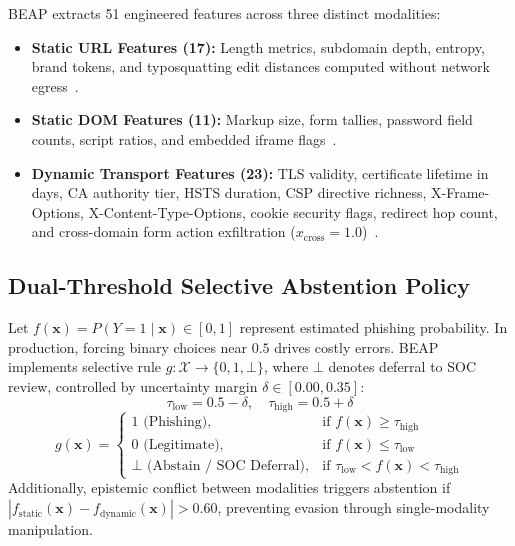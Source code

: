 \documentclass{llncs}
\begin{document}
BEAP extracts 51 engineered features across three distinct modalities:
\begin{itemize}[leftmargin=1.5em]
    \item \textbf{Static URL Features (17):} Length metrics, subdomain depth, entropy, brand tokens, and typosquatting edit distances computed without network egress~\cite{bu2021,kara2022}.
    \item \textbf{Static DOM Features (11):} Markup size, form tallies, password field counts, script ratios, and embedded iframe flags~\cite{anupam2021}.
    \item \textbf{Dynamic Transport Features (23):} TLS validity, certificate lifetime in days, CA authority tier, HSTS duration, CSP directive richness, X-Frame-Options, X-Content-Type-Options, cookie security flags, redirect hop count, and cross-domain form action exfiltration ($x_{\text{cross}} = 1.0$)~\cite{sanchez2022,shukla2024}.
\end{itemize}

\subsection{Dual-Threshold Selective Abstention Policy}

Let $f(\mathbf{x}) = P(Y = 1 \mid \mathbf{x}) \in [0, 1]$ represent estimated phishing probability. In production, forcing binary choices near $0.5$ drives costly errors. BEAP implements selective rule $g: \mathcal{X} \to \{0, 1, \bot\}$, where $\bot$ denotes deferral to SOC review, controlled by uncertainty margin $\delta \in [0.00, 0.35]$:
\begin{equation}
\tau_{\text{low}} = 0.5 - \delta, \quad \tau_{\text{high}} = 0.5 + \delta
\end{equation}
\begin{equation}
g(\mathbf{x}) = \begin{cases}
1 \text{ (Phishing)}, & \text{if } f(\mathbf{x}) \ge \tau_{\text{high}} \\
0 \text{ (Legitimate)}, & \text{if } f(\mathbf{x}) \le \tau_{\text{low}} \\
\bot \text{ (Abstain / SOC Deferral)}, & \text{if } \tau_{\text{low}} < f(\mathbf{x}) < \tau_{\text{high}}
\end{cases}
\end{equation}
Additionally, epistemic conflict between modalities triggers abstention if $|f_{\text{static}}(\mathbf{x}) - f_{\text{dynamic}}(\mathbf{x})| > 0.60$, preventing evasion through single-modality manipulation.
\end{document}

